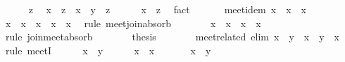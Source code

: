 \begin{isabellebody}
\isanewline
\ \ \ \ \isamarkupfalse%
\ z\ \isamarkupfalse%
\ {\isachardoublequoteopen}x\ {\isasymsqsubseteq}\ z{\isachardoublequoteclose}\ \ {\isachardoublequoteopen}x\ {\isasymsqinter}\ y\ {\isasymsqsubseteq}\ z{\isachardoublequoteclose}\isanewline
\ \ \ \ \isamarkupfalse%
\ {\isachardoublequoteopen}x\ {\isasymsqsubseteq}\ z{\isachardoublequoteclose}\ \isamarkupfalse%
\ fact\isanewline
\ \ \isamarkupfalse%
\isanewline
\isanewline
\ \ \isamarkupfalse%
\ meet{\isacharunderscore}idem{\isacharcolon}\ {\isachardoublequoteopen}x\ {\isasymsqinter}\ x\ {\isacharequal}\ x{\isachardoublequoteclose}\isanewline
\ \ \isamarkupfalse%
\ {\isacharminus}\isanewline
\ \ \ \ \isamarkupfalse%
\ {\isachardoublequoteopen}x\ {\isasymsqinter}\ {\isacharparenleft}x\ {\isasymsqunion}\ {\isacharparenleft}x\ {\isasymsqinter}\ x{\isacharparenright}{\isacharparenright}\ {\isacharequal}\ x{\isachardoublequoteclose}\ \isamarkupfalse%
\ {\isacharparenleft}rule\ meet{\isacharunderscore}join{\isacharunderscore}absorb{\isacharparenright}\isanewline
\ \ \ \ \isamarkupfalse%
\ \isamarkupfalse%
\ {\isachardoublequoteopen}x\ {\isasymsqunion}\ {\isacharparenleft}x\ {\isasymsqinter}\ x{\isacharparenright}\ {\isacharequal}\ x{\isachardoublequoteclose}\ \isamarkupfalse%
\ {\isacharparenleft}rule\ join{\isacharunderscore}meet{\isacharunderscore}absorb{\isacharparenright}\isanewline
\ \ \ \ \isamarkupfalse%
\ \isamarkupfalse%
\ {\isacharquery}thesis\ \isacommand{{\isachardot}}\isamarkupfalse%
\isanewline
\ \ \isamarkupfalse%
\isanewline
\isanewline
\ \ \isamarkupfalse%
\ meet{\isacharunderscore}related\ {\isacharbrackleft}elim{\isacharquery}{\isacharbrackright}{\isacharcolon}\ {\isachardoublequoteopen}x\ {\isasymsqsubseteq}\ y\ {\isasymLongrightarrow}\ x\ {\isasymsqinter}\ y\ {\isacharequal}\ x{\isachardoublequoteclose}\isanewline
\ \ \isamarkupfalse%
\ {\isacharparenleft}rule\ meetI{\isacharparenright}\isanewline
\ \ \ \ \isamarkupfalse%
\ {\isachardoublequoteopen}x\ {\isasymsqsubseteq}\ y{\isachardoublequoteclose}\isanewline
\ \ \ \ \isamarkupfalse%
\ {\isachardoublequoteopen}x\ {\isasymsqsubseteq}\ x{\isachardoublequoteclose}\ \isacommand{{\isachardot}{\isachardot}}\isamarkupfalse%
\isanewline
\ \ \ \ \isamarkupfalse%
\ {\isachardoublequoteopen}x\ {\isasymsqsubseteq}\ y{\isachardoublequoteclose}\ \isamarkupfalse%

\end{isabellebody}
